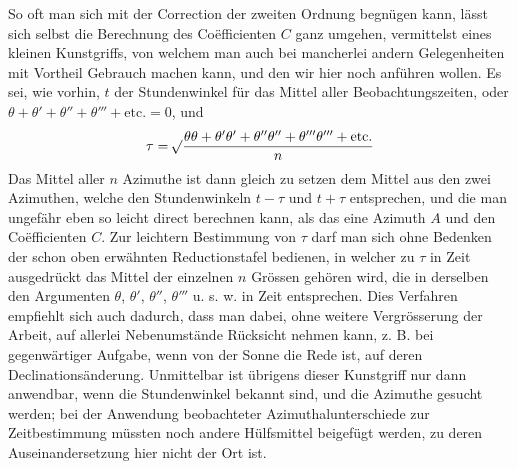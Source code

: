 So oft man sich mit der Correction der zweiten Ordnung begnügen kann, lässt sich selbst die Berechnung des Coëfficienten $C$ ganz umgehen, vermittelst eines kleinen Kunstgriffs, von welchem man auch bei mancherlei andern Gelegenheiten mit Vortheil Gebrauch machen kann, und den wir hier noch anführen wollen. Es sei, wie vorhin, $t$ der Stundenwinkel für das Mittel aller Beobachtungszeiten, oder $\theta+\theta'+\theta''+\theta'''+\text{etc.}=0$, und
\[
\tau=\mathord{{}^{}\!\surd}\frac{\theta\theta+\theta'\theta'+\theta''\theta''+\theta'''\theta'''+\text{etc.}}{n}
\]
Das Mittel aller $n$ Azimuthe ist dann gleich zu setzen dem Mittel aus den zwei Azimuthen, welche den Stundenwinkeln $t-\tau$ und $t+\tau$ entsprechen, und die man ungefähr eben so leicht direct berechnen kann, als das eine Azimuth $A$ und den Coëfficienten $C$. Zur leichtern Bestimmung von $\tau$ darf man sich ohne Bedenken der schon oben erwähnten Reductionstafel bedienen, in welcher zu $\tau$ in Zeit ausgedrückt das Mittel der einzelnen $n$ Grössen gehören wird, die in derselben den Argumenten $\theta$, $\theta'$, $\theta''$, $\theta'''$ u. s. w. in Zeit entsprechen. Dies Verfahren empfiehlt sich auch dadurch, dass man dabei, ohne weitere Vergrösserung der Arbeit, auf allerlei Nebenumstände Rücksicht nehmen kann, z. B. bei gegenwärtiger Aufgabe, wenn von der Sonne die Rede ist, auf deren Declinationsänderung. Unmittelbar ist übrigens dieser Kunstgriff nur dann anwendbar, wenn die Stundenwinkel bekannt sind, und die Azimuthe gesucht werden; bei der Anwendung beobachteter Azimuthalunterschiede zur Zeitbestimmung müssten noch andere Hülfsmittel beigefügt werden, zu deren Auseinandersetzung hier nicht der Ort ist.

